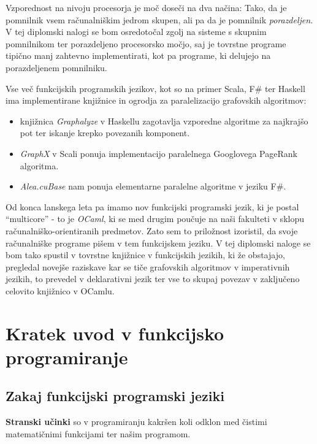 \documentclass[mat1, tisk]{fmfdelo}
\begin{document}
Vzporednost na nivoju procesorja je moč doseči na dva načina: 
Tako, da je pomnilnik vsem računalniškim jedrom skupen, ali pa da je pomnilnik \textit{porazdeljen}. 
V tej diplomski nalogi se bom osredotočal zgolj na sisteme s skupnim pomnilnikom ter porazdeljeno procesorsko močjo, 
saj je tovrstne programe tipično manj zahtevno implementirati, kot pa programe, ki delujejo na porazdeljenem pomnilniku.

Vse več funkcijskih programskih jezikov, kot so na primer Scala, F\# ter Haskell ima implementirane knjižnice
in ogrodja za paralelizacijo grafovskih algoritmov:
\begin{itemize}
    \item knjižnica \textit{Graphalyze} v Haskellu zagotavlja vzporedne algoritme za najkrajšo pot 
    ter iskanje krepko povezanih komponent.
    \item \textit{GraphX} v Scali ponuja implementacijo paralelnega Googlovega PageRank algoritma.
    \item \textit{Alea.cuBase} nam ponuja elementarne paralelne algoritme v jeziku F\#.
\end{itemize}

Od konca lanskega leta pa imamo nov funkcijski programski jezik, ki je postal ``multicore'' - to je \textit{OCaml},
ki se med drugim poučuje na naši fakulteti v sklopu računalniško-orientiranih predmetov. 
Zato sem to priložnost izoristil, da svoje računalniške programe pišem v tem funkcijskem jeziku. 
V tej diplomski naloge se bom tako spustil v tovrstne knjižnice v funkcijskih jezikih, ki že obstajajo, 
pregledal novejše raziskave kar se tiče grafovskih algoritmov v imperativnih jezikih, 
to prevedel v deklarativni jezik ter vse to skupaj povezav v zaključeno celovito knjižnico v OCamlu.

\section{Kratek uvod v funkcijsko programiranje}

\subsection{Zakaj funkcijski programski jeziki}

\begin{definicija}
\textbf{Stranski učinki} so v programiranju kakršen koli odklon med čistimi matematičnimi funkcijami ter našim programom.
\end{definicija}
\end{document}
